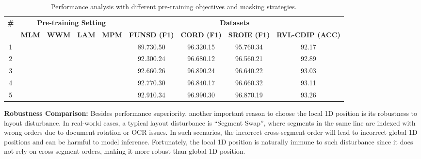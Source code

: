 \documentclass[11pt]{article}
\begin{document}
\begin{table*}[]
\centering
\small
\begin{tabular}{c|cccc|cccc}
\hline
\multirow{2}{*}{\textbf{\#}} & \multicolumn{4}{c|}{\textbf{Pre-training Setting}}        & \multicolumn{4}{c}{\textbf{Datasets}}                                 \\ \cline{2-9} 
                             & \textbf{MLM} & \textbf{WWM} & \textbf{LAM} & \textbf{MPM} & \textbf{FUNSD (F1)} & \textbf{CORD (F1)} & \textbf{SROIE (F1)}  & \textbf{RVL-CDIP (ACC)} \\ \hline
1                            &              &              &              &              & 89.730.50       & 96.320.15    & 95.760.34     & 92.17              \\
2                            &               &               &              &              & 92.300.24      & 96.680.12    & 96.560.21     & 92.89              \\
3                            &               &               &               &              & 92.660.26      & 96.890.24    & 96.640.22     & 93.03              \\
4                            &               &               &          &               & 92.770.30      & 96.840.17    & 96.660.32     & 93.11              \\ 
5                            &               &               &               &               & 92.910.34      & 96.990.30    & 96.870.19     & 93.26              \\ \hline
\end{tabular}
\caption{\label{table:ablation-on-tasks}
Performance analysis with different pre-training objectives and masking strategies.
}
\end{table*}



\noindent\textbf{Robustness Comparison:}
Besides performance superiority, another important reason to choose the local 1D position is its robustness to layout disturbance.
In real-world cases, a typical layout disturbance is ``Segment Swap'', where segments in the same line are indexed with wrong orders due to document rotation or OCR issues.
In such scenarios, the incorrect cross-segment order will lead to incorrect global 1D positions and can be harmful to model inference. Fortunately, the local 1D position is naturally immune to such disturbance since it does not rely on cross-segment orders, making it more robust than global 1D position.
\end{document}
